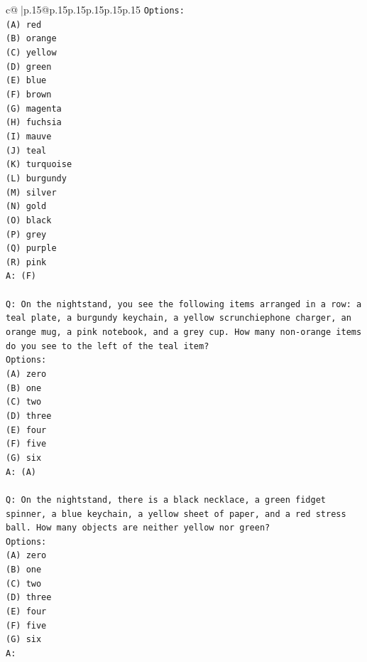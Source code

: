 \documentclass{article}
\begin{document}
{\begin{supertabular}{c@{$\;$}|p{.15\linewidth}@{}p{.15\linewidth}p{.15\linewidth}p{.15\linewidth}p{.15\linewidth}p{.15\linewidth}}
{{{\texttt{Options:} \\
\texttt{(A) red} \\
\texttt{(B) orange} \\
\texttt{(C) yellow} \\
\texttt{(D) green} \\
\texttt{(E) blue} \\
\texttt{(F) brown} \\
\texttt{(G) magenta} \\
\texttt{(H) fuchsia} \\
\texttt{(I) mauve} \\
\texttt{(J) teal} \\
\texttt{(K) turquoise} \\
\texttt{(L) burgundy} \\
\texttt{(M) silver} \\
\texttt{(N) gold} \\
\texttt{(O) black} \\
\texttt{(P) grey} \\
\texttt{(Q) purple} \\
\texttt{(R) pink} \\
\texttt{A: (F)} \\
\\ 
\texttt{Q: On the nightstand, you see the following items arranged in a row: a teal plate, a burgundy keychain, a yellow scrunchiephone charger, an orange mug, a pink notebook, and a grey cup. How many non{-}orange items do you see to the left of the teal item?} \\
\texttt{Options:} \\
\texttt{(A) zero} \\
\texttt{(B) one} \\
\texttt{(C) two} \\
\texttt{(D) three} \\
\texttt{(E) four} \\
\texttt{(F) five} \\
\texttt{(G) six} \\
\texttt{A: (A)} \\
\\ 
\texttt{Q: On the nightstand, there is a black necklace, a green fidget spinner, a blue keychain, a yellow sheet of paper, and a red stress ball. How many objects are neither yellow nor green?} \\
\texttt{Options:} \\
\texttt{(A) zero} \\
\texttt{(B) one} \\
\texttt{(C) two} \\
\texttt{(D) three} \\
\texttt{(E) four} \\
\texttt{(F) five} \\
\texttt{(G) six} \\
\texttt{A:} \\
            }
        }
    }
     \\ \\


\end{supertabular}}
\end{document}
